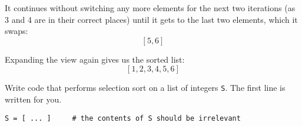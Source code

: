 \documentclass[addpoints]{exam}
\begin{document}
\begin{questions}
It continues without switching any more elements for the next two iterations (as 3 and 4 are in their correct places) until it gets to the last two elements, which it swaps: $$[5,6]$$

Expanding the view again gives us the sorted list: $$[1,2,3,4,5,6]$$

Write code that performs selection sort on a list of integers \verb+S+. The first line is written for you.

\begin{verbatim}
S = [ ... ]     # the contents of S should be irrelevant
\end{verbatim}


\end{questions}
\end{document}
